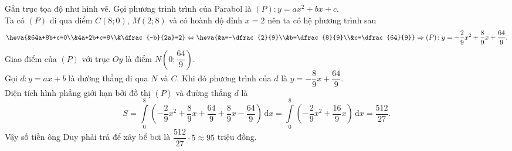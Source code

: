 \begin{ex}
{\begin{center}
\end{center}
Gắn trục tọa độ như hình vẽ.
Gọi phương trinh trình của Parabol là $(P)\colon y=ax^2+bx+c$.\\
Ta có $(P)$ đi qua điểm $C(8;0)$, $M(2;8)$ và có hoành độ đỉnh $x=2$ nên ta có hệ phương trình sau
\[\heva{&64a+8b+c=0\\&4a+2b+c=8\\&\dfrac{-b}{2a}=2}\Leftrightarrow \heva{&a=-\dfrac{2}{9}\\&b=\dfrac{8}{9}\\&c=\dfrac{64}{9}}\Rightarrow (P)\colon y=-\dfrac{2}{9}x^2+\dfrac{8}{9}x+\dfrac{64}{9}.\]
Giao điểm của $(P)$ với trục $Oy$ là điểm $N\left(0;\dfrac{64}{9}\right)$.\\
Gọi $d\colon y=ax+b$ là đường thẳng đi qua $N$ và $C$. Khi đó phương trình của $d$ là $y=-\dfrac{8}{9}x+\dfrac{64}{9}$.\\
Diện tích hình phẳng giới hạn bởi đồ thị $(P)$ và đường thẳng $d$ là
\[S=\displaystyle\int\limits_0^8 \left(-\dfrac{2}{9}x^2+\dfrac{8}{9}x+\dfrac{64}{9}+\dfrac{8}{9}x-\dfrac{64}{9}\right) \mathrm{\, d}x=\displaystyle\int\limits_0^8 \left(-\dfrac{2}{9}x^2+\dfrac{16}{9}x\right) \mathrm{\, d}x=\dfrac{512}{27}.\]
Vậy số tiền ông Duy phải trả để xây bể bơi là $\dfrac{512}{27}\cdot 5\approx 95$ triệu đồng.
}
\end{ex}


